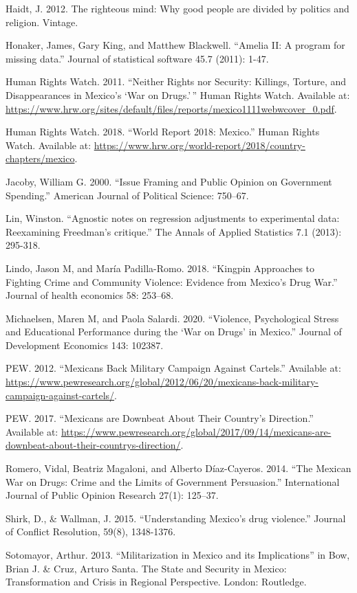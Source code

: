\documentclass[
  12pt,
]{article}
\begin{document}
Haidt, J. 2012. The righteous mind: Why good people are divided by
politics and religion. Vintage.

Honaker, James, Gary King, and Matthew Blackwell. ``Amelia II: A program
for missing data.'' Journal of statistical software 45.7 (2011): 1-47.

Human Rights Watch. 2011. ``Neither Rights nor Security: Killings,
Torture, and Disappearances in Mexico's `War on Drugs.'\,'' Human Rights
Watch. Available at:
\url{https://www.hrw.org/sites/default/files/reports/mexico1111webwcover_0.pdf}.

Human Rights Watch. 2018. ``World Report 2018: Mexico.'' Human Rights
Watch. Available at:
\url{https://www.hrw.org/world-report/2018/country-chapters/mexico}.

Jacoby, William G. 2000. ``Issue Framing and Public Opinion on
Government Spending.'' American Journal of Political Science: 750--67.

Lin, Winston. ``Agnostic notes on regression adjustments to experimental
data: Reexamining Freedman's critique.'' The Annals of Applied
Statistics 7.1 (2013): 295-318.

Lindo, Jason M, and María Padilla-Romo. 2018. ``Kingpin Approaches to
Fighting Crime and Community Violence: Evidence from Mexico's Drug
War.'' Journal of health economics 58: 253--68.

Michaelsen, Maren M, and Paola Salardi. 2020. ``Violence, Psychological
Stress and Educational Performance during the `War on Drugs' in
Mexico.'' Journal of Development Economics 143: 102387.

PEW. 2012. ``Mexicans Back Military Campaign Against Cartels.''
Available at:
\url{https://www.pewresearch.org/global/2012/06/20/mexicans-back-military-campaign-against-cartels/}.

PEW. 2017. ``Mexicans are Downbeat About Their Country's Direction.''
Available at:
\url{https://www.pewresearch.org/global/2017/09/14/mexicans-are-downbeat-about-their-countrys-direction/}.

Romero, Vidal, Beatriz Magaloni, and Alberto Díaz-Cayeros. 2014. ``The
Mexican War on Drugs: Crime and the Limits of Government Persuasion.''
International Journal of Public Opinion Research 27(1): 125--37.

Shirk, D., \& Wallman, J. 2015. ``Understanding Mexico's drug
violence.'' Journal of Conflict Resolution, 59(8), 1348-1376.

Sotomayor, Arthur. 2013. ``Militarization in Mexico and its
Implications'' in Bow, Brian J. \& Cruz, Arturo Santa. The State and
Security in Mexico: Transformation and Crisis in Regional Perspective.
London: Routledge.
\end{document}
